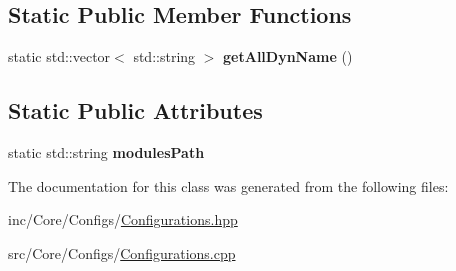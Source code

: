 \subsection*{Static Public Member Functions}
\begin{DoxyCompactItemize}
\item 
\mbox{\label{classcore_1_1Configurations_a90f881cfb6b5b430afb3abcb77de5b06}} 
static std\+::vector$<$ std\+::string $>$ {\bfseries get\+All\+Dyn\+Name} ()
\end{DoxyCompactItemize}
\subsection*{Static Public Attributes}
\begin{DoxyCompactItemize}
\item 
\mbox{\label{classcore_1_1Configurations_a36fd6acfda020ebe632b4bf285dbc24b}} 
static std\+::string {\bfseries modules\+Path}
\end{DoxyCompactItemize}


The documentation for this class was generated from the following files\+:\begin{DoxyCompactItemize}
\item 
inc/\+Core/\+Configs/\hyperlink{Configurations_8hpp}{Configurations.\+hpp}\item 
src/\+Core/\+Configs/\hyperlink{Configurations_8cpp}{Configurations.\+cpp}\end{DoxyCompactItemize}
